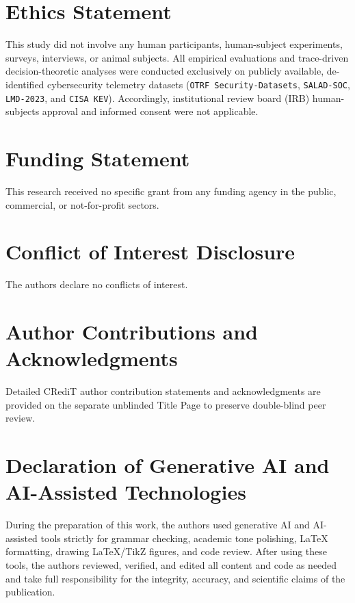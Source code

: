 \documentclass[11pt,a4paper]{article}
\let\oldtexttt\texttt
\renewcommand{\texttt}[1]{\textnormal{\oldtexttt{#1}}}
\begin{document}
\section*{Ethics Statement}
This study did not involve any human participants, human-subject experiments, surveys, interviews, or animal subjects. All empirical evaluations and trace-driven decision-theoretic analyses were conducted exclusively on publicly available, de-identified cybersecurity telemetry datasets (\texttt{OTRF Security-Datasets}, \texttt{SALAD-SOC}, \texttt{LMD-2023}, and \texttt{CISA KEV}). Accordingly, institutional review board (IRB) human-subjects approval and informed consent were not applicable.

\section*{Funding Statement}
This research received no specific grant from any funding agency in the public, commercial, or not-for-profit sectors.

\section*{Conflict of Interest Disclosure}
The authors declare no conflicts of interest.

\section*{Author Contributions and Acknowledgments}
Detailed CRediT author contribution statements and acknowledgments are provided on the separate unblinded Title Page to preserve double-blind peer review.

\section*{Declaration of Generative AI and AI-Assisted Technologies}
During the preparation of this work, the authors used generative AI and AI-assisted tools strictly for grammar checking, academic tone polishing, \LaTeX{} formatting, drawing \LaTeX{}/TikZ figures, and code review. After using these tools, the authors reviewed, verified, and edited all content and code as needed and take full responsibility for the integrity, accuracy, and scientific claims of the publication.



\end{document}
